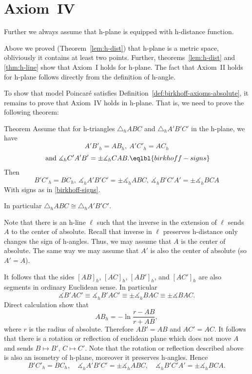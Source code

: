 {\section*{Axiom~IV}

Further we always assume that h-plane is equipped with h-distance function.

Above we proved (Theorem~\ref{lem:h-dist}) that h-plane is a metric space, obliviously it contains at least two points.
Further, theorems~\ref{lem:h-dist} and \ref{thm:h-line} show that Axiom~I holds for h-plane.
The fact that Axiom~II holds for h-plane follows directly from the definition of h-angle.

To show that model Poincar\'e satisfies Definition~\ref{def:birkhoff-axioms-absolute},
it remains to prove that Axiom~IV holds in h-plane.
That is, we need to prove the following theorem:

\begin{thm}{Theorem}
Assume that for h-triangles $\triangle_h A B C$ and $\triangle_h A' B' C'$ in the h-plane, we have
$$A' B'_h= A B_h,
\ A' C'_h= A C_h$$
$$\ \text{and}\ 
\measuredangle_h C' A' B'=\pm\measuredangle_h C A B.\eqlbl{birkhoff-signs}$$
Then 
$$ B' C'_h= B C_h,
\ \measuredangle_h A' B' C'=\pm\measuredangle_h A B C,
\ \measuredangle_h B' C' A'=\pm\measuredangle_h B  C A $$
With signs as in \ref{birkhoff-signs}.

In particular $\triangle_h A B C\cong\triangle_h A' B' C'$.
\end{thm}


Note that there is an h-line $\ell$ such that the inverse in the extension of $\ell$ sends $A$ to the center of absolute.
Recall that inverse in $\ell$ preserves h-distance only changes the sign of h-angles.%
Thus, we may assume that $A$ is the center of absolute.
The same way we may assume that $A'$ is also the center of absolute (so $A'=A$).

It follows that the sides $[AB]_h$, $[AC]_h$, $[AB']_h$, and $[AC']_h$ are also segments in ordinary Euclidean sense.
In particular 
$$\measuredangle B'AC'\equiv\measuredangle_h B'AC'\equiv\pm\measuredangle_h BAC\equiv\pm\measuredangle BAC.$$
Direct calculation show that 
$$AB_h=-\ln\frac{r-AB}{r+AB},$$
where $r$ is the radius of absolute.
Therefore $A B'=AB$ and $A C'=AC$.
It follows that there is a rotation or reflection of euclidean plane which does not move $A$ and sends $B\mapsto B'$, $C\mapsto C'$.
Note that the rotation or reflection described above is also an isometry of h-plane,
moreover it preserves h-angles.
Hence   
$$ B' C'_h= B C_h,
\quad
\measuredangle_h A' B' C'
=
\pm\measuredangle_h A B C,
\quad
\measuredangle_h B' C' A'
=
\pm\measuredangle_h B  C A.
$$
\qedsf













}
